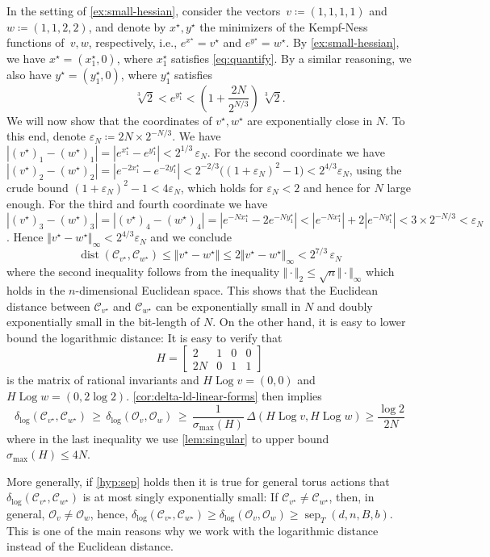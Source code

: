 \documentclass[a4paper,USenglish,cleveref,numberwithinsect]{lipics-v2021}
\DeclareMathOperator{\sep}{sep}
\DeclareMathOperator{\Log}{Log}
\DeclareMathOperator{\dist}{dist}
\newcommand{\distLD}{\delta_{\log}}
\newcommand{\OO}{\ensuremath{\mathcal{O}}}
\newcommand{\KK}{\ensuremath{\mathcal{C}}}
\numberwithin{equation}{section}
\begin{document}
\begin{remark}
In the setting of \cref{ex:small-hessian}, consider the vectors~$v\coloneqq (1,1,1,1)$ and $w\coloneqq (1,1,2,2)$, and denote by $x^\star,y^\star$ the minimizers of the Kempf-Ness functions of~$v,w$, respectively, i.e., $e^{x^\star}=v^\star$ and $e^{y^\star}=w^\star$.
By \cref{ex:small-hessian}, we have $x^\star=(x^\star_1,0)$, where $x^\star_1$ satisfies \cref{eq:quantify}.
By a similar reasoning, we also have $y^\star=(y^\star_1,0)$, where $y^\star_1$ satisfies
\[
  \sqrt[3]{2} < e^{y^\star_1} < \left( 1 + \frac{2N}{2^{N/3}} \right)\, \sqrt[3]{2}.
\]
We will now show that the coordinates of $v^\star, w^\star$ are exponentially close in $N$.
To this end, denote $\varepsilon_N\coloneqq 2N \times 2^{-N/3}$.
We have $|(v^\star)_1-(w^\star)_1| = |e^{x^\star_1}-e^{y^\star_1}| < 2^{1/3}\,\varepsilon_N $.
For the second coordinate we have $|(v^\star)_2-(w^\star)_2|=|e^{-2x^\star_1}-e^{-2y^\star_1}|<2^{-2/3}\big((1+\varepsilon_N)^2-1\big)< 2^{4/3}\varepsilon_N$, using the crude bound $(1+\varepsilon_N)^2-1<4\varepsilon_N$, which holds for $\varepsilon_N<2$ and hence for $N$ large enough.
For the third and fourth coordinate we have $|(v^\star)_3-(w^\star)_3|=|(v^\star)_4-(w^\star)_4|=|e^{-Nx^\star_1}-2e^{-Ny^\star_1}|<|e^{-Nx^\star_1}|+2|e^{-Ny^\star_1}|<3\times 2^{-N/3}<\varepsilon_N$.
Hence $\Vert v^\star-w^\star\Vert_{\infty}<2^{4/3}\varepsilon_N$ and we conclude
\[
  \dist(\KK_{v^\star},\KK_{w^\star}) \leq \Vert v^\star-w^\star\Vert \leq 2\Vert v^\star-w^\star\Vert_{\infty} < 2^{7/3}\, \varepsilon_N
\]
where the second inequality follows from the inequality $\Vert\cdot\Vert_2\leq \sqrt{n}\Vert\cdot\Vert_\infty$ which holds in the $n$-dimensional Euclidean space.
This shows that the Euclidean distance between $\KK_{v^\star}$ and $\KK_{w^\star}$ can be exponentially small in $N$ and doubly exponentially small in the bit-length of $N$.
On the other hand, it is easy to lower bound the logarithmic distance: It is easy to verify that \[
H=\begin{bmatrix}
    2 & 1 & 0 & 0\\
    2N & 0 & 1 & 1
\end{bmatrix}
\] is the matrix of rational invariants and $H\Log v = (0,0)$ and $H\Log w = (0, 2\log 2)$. \cref{cor:delta-ld-linear-forms} then implies \[
\distLD(\KK_{v^\star},\KK_{w^\star}) \, \geq \, \distLD(\OO_v,\OO_w) \, \geq \, \frac{1}{\sigma_{\max}(H)} \, \Delta(H \Log v, H\Log w) \geq \frac{\log 2}{2N}
\] where in the last inequality we use \cref{lem:singular} to upper bound $\sigma_{\max}(H)\leq 4N$.

More generally, if \cref{hyp:sep} holds then it is true for general torus actions that $\distLD(\KK_{v^\star},\KK_{w^\star})$ is at most singly exponentially small:
If $\KK_{v^\star}\neq\KK_{w^\star}$, then, in general, $\OO_v\neq\OO_w$, hence, $\distLD(\KK_{v^\star},\KK_{w^\star})\geq \distLD(\OO_v,\OO_w)\geq \sep_T(d,n,B,b)$.
This is one of the main reasons why we work with the logarithmic distance instead of the Euclidean distance.
\end{remark}
\end{document}
